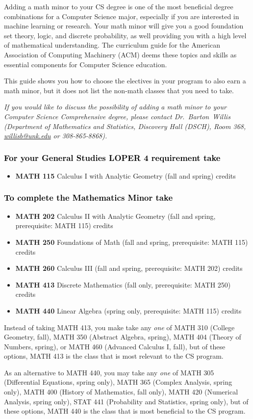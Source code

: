 \documentclass[10pt]{article}
\makeatletter
\newenvironment{mypar}[2]
   {\begin{list}{}%
     {\setlength\leftmargin{#1}
     \setlength\rightmargin{#2}}
     \item[]}
   {\end{list}}
\newcommand{\calcone}{\textbf{MATH 115} Calculus I with Analytic Geometry (fall and spring) \dotfill 5 credits}
\newcommand{\calctwo}{\textbf{MATH 202} Calculus II with Analytic Geometry (fall and spring, prerequisite: MATH 115) \dotfill 5 credits }
\newcommand{\foundations}{\textbf{MATH 250} Foundations of Math (fall and spring, prerequisite: MATH 115)  \dotfill 3 credits}
\newcommand{\calcthree}{\textbf{MATH 260} Calculus III  (fall and spring, prerequisite: MATH 202) \dotfill 5 credits}
\newcommand{\linear}{\textbf{MATH 440} Linear Algebra (spring only, prerequisite: MATH 115) \dotfill 3 credits}
\newcommand{\discrete}{\textbf{MATH 413} Discrete Mathematics  (fall only, prerequisite: MATH 250)\dotfill 3 credits}
\newcommand{\contactbw}{\mbox{Dr.\ Barton Willis} (Department of Mathematics and Statistics,  Discovery Hall (DSCH), Room 368,
\href{mailto:willisb@unk.edu}{willisb@unk.edu} or 308-865-8868)}
\makeatother
\begin{document}
Adding a math minor to your CS degree is one of the most beneficial degree combinations for a Computer Science major, especially if you are interested in machine learning or research.  Your math minor will give you a good foundation set theory, logic, and discrete probability, as well providing you with a high level of mathematical understanding.
The curriculum guide for the American Association of Computing Machinery (ACM) deems  these topics and skills  as essential components for  Computer Science education.

 This guide shows you how to choose the electives in your program to also earn a math minor, but it does not list the non-math classes that you need to take.

 \textcolor{unkblue}{\emph{If you would like to discuss the possibility of  adding a math minor to your Computer Science Comprehensive degree, please contact \contactbw.}}

\vspace{-0.1in}

\subsubsection*{\textcolor{black}{For  your General Studies LOPER 4 requirement take}}
\begin{itemize}
\item  \calcone
\end{itemize}

\subsubsection*{\textcolor{black}{To complete the Mathematics Minor take}}

\begin{itemize}
\item \calctwo
\item \foundations
\item \calcthree
\item \discrete
\item \linear
\end{itemize}
\begin{mypar}{0.5cm}{0.5cm}{Instead of taking MATH 413, you make take any \emph{one} of MATH 310 (College Geometry, fall),  MATH 350 (Abstract Algebra, spring),  MATH 404  (Theory of Numbers, spring), or MATH 460 (Advanced Calculus I, fall), but of these options, MATH 413 is  the class that is most relevant to the CS program.

  \quad As an alternative to MATH 440, you may take any \emph{one} of
  MATH 305 (Differential Equations, spring only),
MATH 365 (Complex Analysis, spring only),
MATH 400 (History of Mathematics, fall only),
MATH 420 (Numerical Analysis, spring only),
STAT 441 (Probability and Statistics, spring only),
but of these options, MATH 440 is  the class that is most beneficial to the CS program.
}
\end{mypar}
\end{document}
